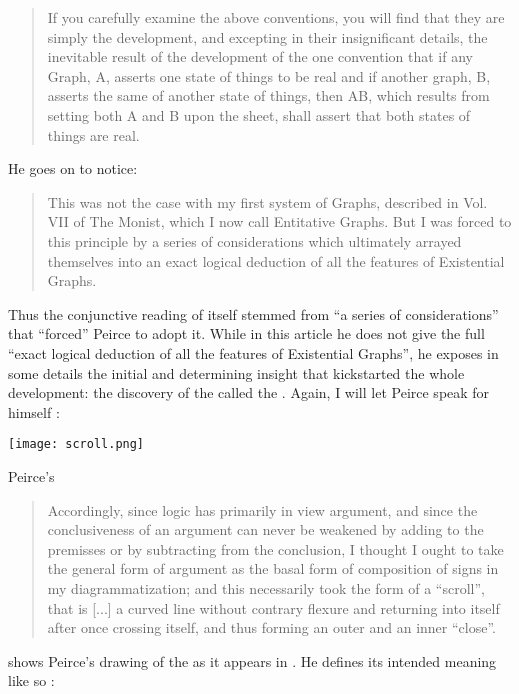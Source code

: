\begin{scope}
\begin{quote}
If you carefully examine the above conventions, you will find that they are
simply the development, and excepting in their insignificant details, the
inevitable result of the development of the one convention that if any Graph, A,
asserts one state of things to be real and if another graph, B, asserts the same
of another state of things, then AB, which results from setting both A and B
upon the sheet, shall assert that both states of things are real.
\end{quote}

He goes on to notice:

\begin{quote}
   This was not the case with my first system of Graphs, described in Vol. VII
of The Monist, which I now call Entitative Graphs. But I was forced to this
principle by a series of considerations which ultimately arrayed themselves into
an exact logical deduction of all the features of Existential Graphs.
\end{quote}

Thus the conjunctive reading of  itself stemmed from ``a
series of considerations'' that ``forced'' Peirce to adopt it. While in this
article he does not give the full ``exact logical deduction of all the features
of Existential Graphs'', he exposes in some details the initial and determining
insight that kickstarted the whole development: the discovery of the 
called the . Again, I will let Peirce speak for himself
\cite[pp.~533--534]{peirce_prolegomena_1906}:

\begin{marginfigure}
  \texttt{[image: scroll.png]}
  \caption{Peirce's }
\end{marginfigure}

\begin{quote}
  Accordingly, since logic has primarily in view argument, and since the
conclusiveness of an argument can never be weakened by adding to the premisses
or by subtracting from the conclusion, I thought I ought to take the general
form of argument as the basal form of composition of signs in my
diagrammatization; and this necessarily took the form of a ``scroll'', that is
[...] a curved line without contrary flexure and returning into itself after
once crossing itself, and thus forming an outer and an inner ``close''.
\end{quote}

 shows Peirce's drawing of the  as it appears in
\cite[Fig.~5]{peirce_prolegomena_1906}. He defines its intended meaning like so
\cite[p.~534--535]{peirce_prolegomena_1906}:


\end{scope}
